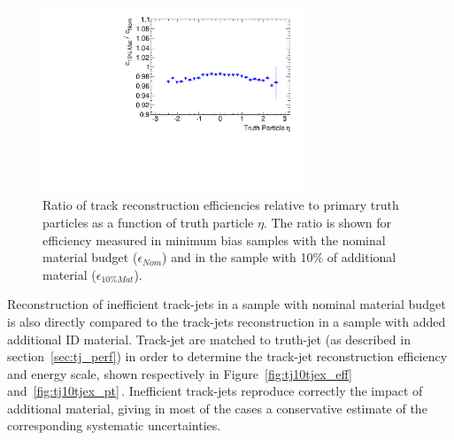 \begin{figure}[p]
\centering
\includegraphics[width=0.7\textwidth]{figure/trackjet/trk_eff2.pdf}
\caption{Ratio of track reconstruction efficiencies relative to primary truth particles as a function of truth particle $\eta$.
	 The ratio is shown for efficiency measured in minimum bias samples with the nominal material budget ($\epsilon_{Nom}$)
	and in the sample with 10\% of additional material ($\epsilon_{10\%Mat}$).}

\label{fig:trk_eff}
\end{figure}    


Reconstruction of inefficient track-jets in a sample with nominal material budget is also directly compared 
to the track-jets reconstruction in a sample with added additional ID material. Track-jet are matched
to truth-jet (as described in section~\ref{sec:tj_perf}) in order to determine the track-jet 
reconstruction efficiency and energy scale, shown respectively in Figure~\ref{fig:tj10tjex_eff} and~\ref{fig:tj10tjex_pt}$\,$.
Inefficient track-jets reproduce correctly the impact  of additional material,
giving in most of the cases a conservative estimate of the corresponding systematic uncertainties.


